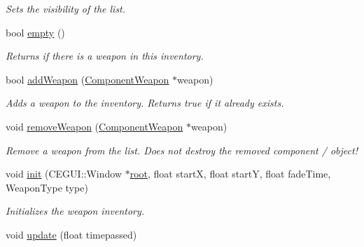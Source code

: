 \begin{DoxyCompactItemize}
\begin{DoxyCompactList}\small\item\em \-Sets the visibility of the list. \end{DoxyCompactList}\item 
\hypertarget{classWeaponInventory_a807b3672966e62210b8f943af373d801}{
bool \hyperlink{classWeaponInventory_a807b3672966e62210b8f943af373d801}{empty} ()}
\label{d8/da9/classWeaponInventory_a807b3672966e62210b8f943af373d801}

\begin{DoxyCompactList}\small\item\em \-Returns if there is a weapon in this inventory. \end{DoxyCompactList}\item 
\hypertarget{classWeaponInventory_abf8b8c594ae9e528561d133f11b02dfa}{
bool \hyperlink{classWeaponInventory_abf8b8c594ae9e528561d133f11b02dfa}{add\-Weapon} (\hyperlink{classComponentWeapon}{\-Component\-Weapon} $\ast$weapon)}
\label{d8/da9/classWeaponInventory_abf8b8c594ae9e528561d133f11b02dfa}

\begin{DoxyCompactList}\small\item\em \-Adds a weapon to the inventory. \-Returns true if it already exists. \end{DoxyCompactList}\item 
\hypertarget{classWeaponInventory_ab3d4ca590be6c47adf542e92ebd0747e}{
void \hyperlink{classWeaponInventory_ab3d4ca590be6c47adf542e92ebd0747e}{remove\-Weapon} (\hyperlink{classComponentWeapon}{\-Component\-Weapon} $\ast$weapon)}
\label{d8/da9/classWeaponInventory_ab3d4ca590be6c47adf542e92ebd0747e}

\begin{DoxyCompactList}\small\item\em \-Remove a weapon from the list. \-Does not destroy the removed component / object! \end{DoxyCompactList}\item 
\hypertarget{classWeaponInventory_afd0aaa6a17b403e292c62201c4677e44}{
void \hyperlink{classWeaponInventory_afd0aaa6a17b403e292c62201c4677e44}{init} (\-C\-E\-G\-U\-I\-::\-Window $\ast$\hyperlink{classWeaponInventory_a6359c329d9d27e34197f42a09f6d5ff3}{root}, float start\-X, float start\-Y, float fade\-Time, \-Weapon\-Type type)}
\label{d8/da9/classWeaponInventory_afd0aaa6a17b403e292c62201c4677e44}

\begin{DoxyCompactList}\small\item\em \-Initializes the weapon inventory. \end{DoxyCompactList}\item 
\hypertarget{classWeaponInventory_a7753c2aeb0715a1e5eeb91e83171b535}{
void \hyperlink{classWeaponInventory_a7753c2aeb0715a1e5eeb91e83171b535}{update} (float timepassed)}
\label{d8/da9/classWeaponInventory_a7753c2aeb0715a1e5eeb91e83171b535}


\end{DoxyCompactItemize}
